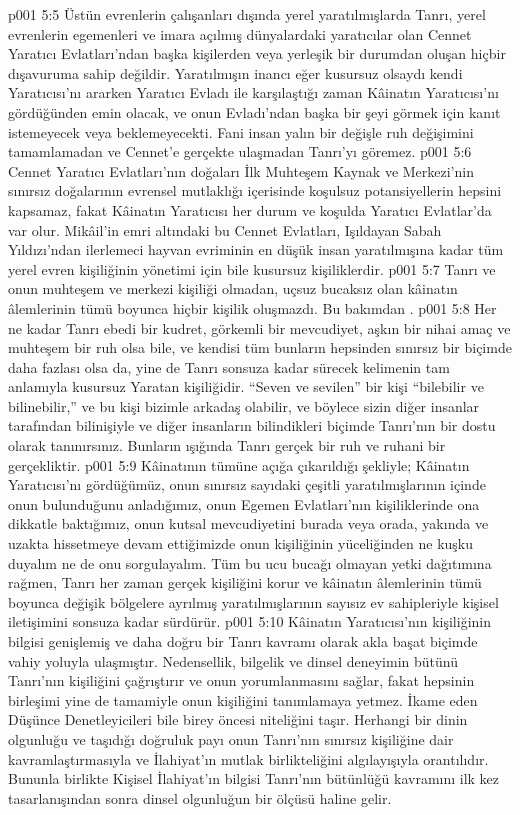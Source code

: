 \vs p001 5:5 Üstün evrenlerin çalışanları dışında yerel yaratılmışlarda Tanrı, yerel evrenlerin egemenleri ve imara açılmış dünyalardaki yaratıcılar olan Cennet Yaratıcı Evlatları’ndan başka kişilerden veya yerleşik bir durumdan oluşan hiçbir dışavuruma sahip değildir. Yaratılmışın inancı eğer kusursuz olsaydı kendi Yaratıcısı’nı ararken Yaratıcı Evladı ile karşılaştığı zaman Kâinatın Yaratıcısı’nı gördüğünden emin olacak, ve onun Evladı’ndan başka bir şeyi görmek için kanıt istemeyecek veya beklemeyecekti. Fani insan yalın bir değişle ruh değişimini tamamlamadan ve Cennet’e gerçekte ulaşmadan Tanrı’yı göremez.
\vs p001 5:6 Cennet Yaratıcı Evlatları’nın doğaları İlk Muhteşem Kaynak ve Merkezi’nin sınırsız doğalarının evrensel mutlaklığı içerisinde koşulsuz potansiyellerin hepsini kapsamaz, fakat Kâinatın Yaratıcısı her durum ve koşulda Yaratıcı Evlatlar’da  var olur. Mikâil’in emri altındaki bu Cennet Evlatları, Işıldayan Sabah Yıldızı’ndan ilerlemeci hayvan evriminin en düşük insan yaratılmışına kadar tüm yerel evren kişiliğinin yönetimi için bile kusursuz kişiliklerdir.
\vs p001 5:7 Tanrı ve onun muhteşem ve merkezi kişiliği olmadan, uçsuz bucaksız olan kâinatın âlemlerinin tümü boyunca hiçbir kişilik oluşmazdı. Bu bakımdan .
\vs p001 5:8 Her ne kadar Tanrı ebedi bir kudret, görkemli bir mevcudiyet, aşkın bir nihai amaç ve muhteşem bir ruh olsa bile, ve kendisi tüm bunların hepsinden sınırsız bir biçimde daha fazlası olsa da, yine de Tanrı sonsuza kadar sürecek kelimenin tam anlamıyla kusursuz Yaratan kişiliğidir. “Seven ve sevilen” bir kişi “bilebilir ve bilinebilir,” ve bu kişi bizimle arkadaş olabilir, ve böylece sizin diğer insanlar tarafından bilinişiyle ve diğer insanların bilindikleri biçimde Tanrı’nın bir dostu olarak tanınırsınız. Bunların ışığında Tanrı gerçek bir ruh ve ruhani bir gerçekliktir.
\vs p001 5:9 Kâinatının tümüne açığa çıkarıldığı şekliyle; Kâinatın Yaratıcısı’nı gördüğümüz, onun sınırsız sayıdaki çeşitli yaratılmışlarının içinde onun bulunduğunu anladığımız, onun Egemen Evlatları’nın kişiliklerinde ona dikkatle baktığımız, onun kutsal mevcudiyetini burada veya orada, yakında ve uzakta hissetmeye devam ettiğimizde onun kişiliğinin yüceliğinden ne kuşku duyalım ne de onu sorgulayalım. Tüm bu ucu bucağı olmayan yetki dağıtımına rağmen, Tanrı her zaman gerçek kişiliğini korur ve kâinatın âlemlerinin tümü boyunca değişik bölgelere ayrılmış yaratılmışlarının sayısız ev sahipleriyle kişisel iletişimini sonsuza kadar sürdürür.
\vs p001 5:10 Kâinatın Yaratıcısı’nın kişiliğinin bilgisi genişlemiş ve daha doğru bir Tanrı kavramı olarak akla başat biçimde vahiy yoluyla ulaşmıştır. Nedensellik, bilgelik ve dinsel deneyimin bütünü Tanrı’nın kişiliğini çağrıştırır ve onun yorumlanmasını sağlar, fakat hepsinin birleşimi yine de tamamiyle onun kişiliğini tanımlamaya yetmez. İkame eden Düşünce Denetleyicileri bile birey öncesi niteliğini taşır. Herhangi bir dinin olgunluğu ve taşıdığı doğruluk payı onun Tanrı’nın sınırsız kişiliğine dair kavramlaştırmasıyla ve İlahiyat’ın mutlak birlikteliğini algılayışıyla orantılıdır. Bununla birlikte Kişisel İlahiyat’ın bilgisi Tanrı’nın bütünlüğü kavramını ilk kez tasarlanışından sonra dinsel olgunluğun bir ölçüsü haline gelir.
